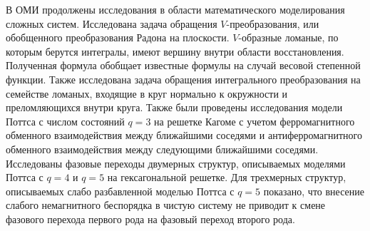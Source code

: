 В ОМИ продолжены исследования в области математического моделирования сложных систем. Исследована задача обращения $V$-преобразования, или обобщенного преобразования Радона на плоскости. $V$-образные ломаные, по которым берутся интегралы, имеют вершину внутри области восстановления. Полученная формула обобщает известные формулы на случай весовой степенной функции. Также исследована задача обращения интегрального преобразования на семействе ломаных, входящие в круг нормально к окружности и преломляющихся внутри круга.
Также были проведены исследования модели Поттса с числом состояний $q=3$ на решетке Кагоме с учетом ферромагнитного обменного взаимодействия между ближайшими
соседями и антиферромагнитного обменного взаимодействия между следующими ближайшими соседями. Исследованы фазовые переходы двумерных структур, описываемых моделями Поттса с $q=4$ и $q=5$ на гексагональной решетке. 
Для трехмерных структур, описываемых слабо разбавленной моделью Поттса с $q=5$ показано, что внесение слабого немагнитного беспорядка в
чистую систему не приводит к смене фазового перехода первого рода на фазовый переход второго рода.





